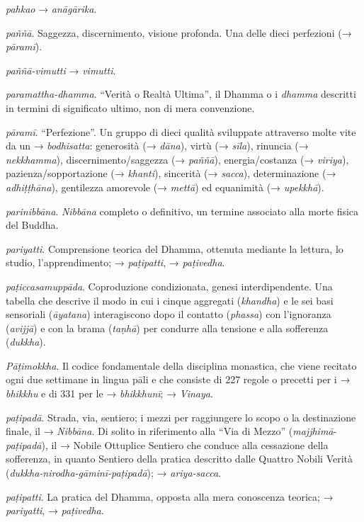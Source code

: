 \emph{pahkao} → \emph{anāgārika}.

\emph{paññā}. Saggezza, discernimento, visione profonda. Una delle dieci
perfezioni (→ \emph{pāramī}).

\emph{paññā-vimutti} → \emph{vimutti}.

\emph{paramattha-dhamma}. ``Verità o Realtà Ultima'', il Dhamma o i
\emph{dhamma} descritti in termini di significato ultimo, non di mera
convenzione.

\emph{pāramī}. ``Perfezione''. Un gruppo di dieci qualità sviluppate
attraverso molte vite da un → \emph{bodhisatta}: generosità (→
\emph{dāna}), virtù (→ \emph{sīla}), rinuncia (→ \emph{nekkhamma}),
discernimento/saggezza (→ \emph{paññā}), energia/costanza (→
\emph{viriya}), pazienza/sopportazione (→ \emph{khanti}), sincerità (→
\emph{sacca}), determinazione (→ \emph{adhiṭṭhāna}), gentilezza
amorevole (→ \emph{mettā}) ed equanimità (→ \emph{upekkhā}).

\emph{parinibbāna}. \emph{Nibbāna} completo o definitivo, un termine
associato alla morte fisica del Buddha.

\emph{pariyatti}. Comprensione teorica del Dhamma, ottenuta mediante la
lettura, lo studio, l'apprendimento; → \emph{paṭipatti}, →
\emph{paṭivedha}.

\emph{paṭiccasamuppāda}. Coproduzione condizionata, genesi
interdipendente. Una tabella che descrive il modo in cui i cinque
aggregati (\emph{khandha}) e le sei basi sensoriali (\emph{āyatana})
interagiscono dopo il contatto (\emph{phassa}) con l'ignoranza
(\emph{avijjā}) e con la brama (\emph{taṇhā}) per condurre alla tensione
e alla sofferenza (\emph{dukkha}).

\emph{Pāṭimokkha}. Il codice fondamentale della disciplina monastica,
che viene recitato ogni due settimane in lingua pāli e che consiste di
227 regole o precetti per i → \emph{bhikkhu} e di 331 per le →
\emph{bhikkhunī}; → \emph{Vinaya}.

\emph{paṭipadā}. Strada, via, sentiero; i mezzi per raggiungere lo scopo
o la destinazione finale, il → \emph{Nibbāna}. Di solito in riferimento
alla ``Via di Mezzo'' (\emph{majjhimā}-\emph{paṭipadā}), il → Nobile
Ottuplice Sentiero che conduce alla cessazione della sofferenza, in
quanto Sentiero della pratica descritto dalle Quattro Nobili Verità
(\emph{dukkha-nirodha-gāminī-paṭipadā}); → \emph{ariya-sacca}.

\emph{paṭipatti}. La pratica del Dhamma, opposta alla mera conoscenza
teorica; → \emph{pariyatti}, → \emph{paṭivedha}.

